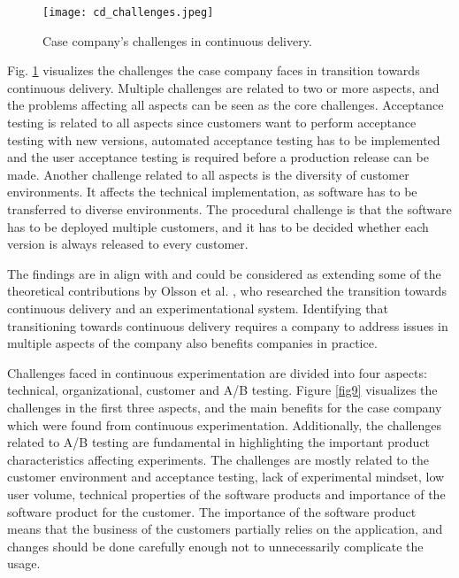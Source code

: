 \documentclass[english]{tktltiki2}
\theoremstyle{definition}
\theoremstyle{remark}
\begin{document}
\begin{figure}[!htb]
	\centering
	\texttt{[image: cd\_challenges.jpeg]}
	\caption{Case company's challenges in continuous delivery.}
	\label{fig8}
\end{figure}

Fig. \ref{fig8} visualizes the challenges the case company faces in transition towards continuous delivery. Multiple challenges are related to two or more aspects, and the problems affecting all aspects can be seen as the core challenges. Acceptance testing is related to all aspects since customers want to perform acceptance testing with new versions, automated acceptance testing has to be implemented and the user acceptance testing is required before a production release can be made. Another challenge related to all aspects is the diversity of customer environments. It affects the technical implementation, as software has to be transferred to diverse environments. The procedural challenge is that the software has to be deployed multiple customers, and it has to be decided whether each version is always released to every customer. 

The findings are in align with and could be considered as extending some of the theoretical contributions by Olsson et al. \cite{olsson2012climbing}, who researched the transition towards continuous delivery and an experimentational system. Identifying that transitioning towards continuous delivery requires a company to address issues in multiple aspects of the company also benefits companies in practice.   







Challenges faced in continuous experimentation are divided into four aspects: technical, organizational, customer and A/B testing. Figure \ref{fig9} visualizes the challenges in the first three aspects, and the main benefits for the case company which were found from continuous experimentation. Additionally, the challenges related to A/B testing are fundamental in highlighting the important product characteristics affecting experiments. The challenges are mostly related to the customer environment and acceptance testing, lack of experimental mindset, low user volume, technical properties of the software products and importance of the software product for the customer. The importance of the software product means that the business of the customers partially relies on the application, and changes should be done carefully enough not to unnecessarily complicate the usage. 
\end{document}
